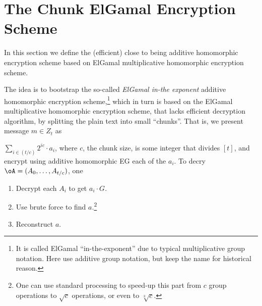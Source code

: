 \newcommand{\rEgKeyGen}{{\cR_{\sf EGKeyGen}}}

\newcommand{\rEgKeyGenDef}
{
	\set{(E,e))\colon e\cdot G= E}
}


\newcommand{\rEGEnc}{{\cR_{\sf EgEnc}}}

\newcommand{\rEGEncDef}
{
	\set{((E,\tA),(a,r))\colon \EgEnc_E(a;r)= \tA}
}


\newcommand{\rDec}{{\cR_{\sf Dec}}}
\newcommand{\rDecDef}
{
	\set{((\pk,\oA,b),(\oa,\orr))\colon \forall i\in (\ell)\colon  \EgEnc_\pk(\oa_i;\orr_i)= \oA_i  
		\sland \oa_i \in (b)}
}


\newcommand{\EgEqs}{{\sf EgEq}}
\newcommand{\rEgEq}{\cR_\Eqs}

\newcommand{\rEgEqDef}
{
	\set{((E_0,E_1,\tA_0,\tA_1),(a,r_0,r_1))\colon \forall i\in \zo \; \EgEnc_{E_i}(a;r_i)= \tA_i}
}


\newcommand{\EgRPs}{{\sf EgRp}}
\newcommand{\rEgRp}{\cR_\EgRPs}

\newcommand{\rEgRpDef}
{
	\set{((E,\tA,b),(a,r))\colon \Enc_E(a;r)= \tA \sland a\in (b)}
}


\newcommand{\EgLrgs}{{\sf EgLrger}}
\newcommand{\rEgLrg}{\cR_\EgLrgs}

\newcommand{\rEgLrgDef}
{
	\set{((E,\tA_0,\ttA_1),(a_0,r_0,a_1,r_1))\colon \forall i\in \zo \; \EgEnc_\pk(a_i;r_i)= A_i \sland a_1 -a_0 \in [q]} 
}





\section{The Chunk ElGamal  Encryption Scheme}\label{sec:ChanksEG}
In this section we define the (efficient)  close to being additive homomorphic encryption scheme based on ElGamal multiplicative  homomorphic encryption scheme.  


The idea is to bootstrap the so-called   \textit{ElGamal in-the exponent}   additive homomorphic encryption  scheme,\footnote{It is called ElGamal ``in-the-exponent'' due to typical multiplicative group notation. Here use additive group notation, but keep the name for historical reason.}  which in turn is based on the  ElGamal multiplicative  homomorphic encryption scheme, that lacks efficient decryption algorithm, by splitting the plain text into small ``chunks''. That  is, we present message $m\in Z_t$ as

$\sum_{i \in (t/c)}   2^{i c} \cdot a_i$, where $c$, the chunk size, is  some integer that divides $[t]$, and encrypt using    additive homomorphic EG each of the $a_i$. To decry $\oA= (A_0,\ldots,A_{t/c})$, one  
\begin{enumerate}
	\item Decrypt   each $A_i$ to get $a_i  \cdot G$.
	\item Use brute force to find $a$.\footnote{One can use standard   processing to speed-up this part from $c$ group operations to $\sqrt{c}$  operations, or even  to   $\sqrt[3]{c}$.}
	
	\item Reconstruct $a$.
\end{enumerate}



